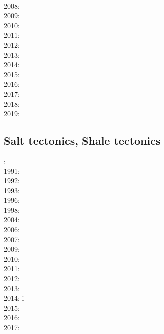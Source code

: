 {      \cite{werr07}\\
2008: \cite{cort08}\cite{gumb08}\cite{buhb08}\cite{hube08}\cite{peso08}\\
2009: \cite{agcz09}\cite{kekj09}\cite{sihb09}\\
2010: \cite{aubh10}\cite{gery10}\cite{fosr10}\cite{gerya2010}\\
2011: \cite{alht11}\cite{ellw11}\cite{hube11}\\
2012: \cite{alht12}\cite{brps12}\cite{bein12}\\
2013: \cite{alhf13}\cite{brau13}\cite{chbe13}\cite{knak13}\cite{kern13}\cite{mipf13}\cite{wabd13}
      \cite{gery13}\cite{ligw13}\cite{gery13c}\\
2014: \cite{hebr14}\cite{lige14}\cite{brun14}\cite{kobf14}\cite{ebva14}\cite{puge14}\cite{lige14b}
      \cite{hube14}\\
2015: \cite{nabu15}\cite{clbq15}\cite{huyb15}\cite{shmj15}\\
2016: \cite{olbm16}\cite{jekm16}\cite{zwsn16}\\
2017: \cite{lemh17}\cite{brcr17}\cite{bekb17}\cite{nabp17}\\
2018: \cite{chsm18}\cite{brwm18}\cite{brun18}\cite{tebu18}\cite{jebu18}\cite{sahf18}\cite{pesn18}
      \cite{mord18}\cite{webe18}\cite{webe18b}\\
2019: \cite{lisp19}\cite{zwsb19}\cite{anpa19}\cite{dual19}\cite{mocb19}\cite{chmd19}\cite{thhu19}
}

\subsection{Salt tectonics, Shale tectonics}

{\scriptsize
{}: \cite{woid78}\\
1991: \cite{tars91}\\
1992: \cite{zaju92}\\
1993: \cite{nabr93}\cite{vasv93}\cite{wejv93}\cite{wein93}\\
1996: \cite{maar96}\\
1998: \cite{giju98}\\
2004: \cite{istt04}\cite{geim04}\\
2006: \cite{maqs07}\\
2007: \cite{huja07}\cite{maqs07}\\
2009: \cite{grba09}\\
2010: \cite{albe10}\cite{albi10}\cite{inbe10}\cite{inbe10b}\cite{albs10}\\
2011: \cite{brfo11}\\
2012: \cite{fejr12}\cite{liqi12}\cite{grbe12}\cite{albe12}\cite{grbi12}\cite{goib12}\\
2013: \cite{gobi13}\\
2014: \cite{bakp14}\cite{feka14a}\cite{feka14b}\cite{ghbu14}\cite{nifh14}i\cite{peel14}\\
2015: \cite{feka15}\\
2016: \cite{masg16}\cite{albe16}\\
2017: \cite{grbe17}
}

